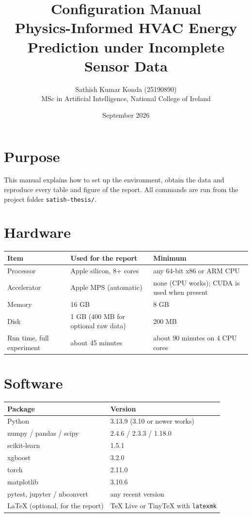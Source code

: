 \documentclass[11pt,a4paper]{article}
\title{Configuration Manual\\[4pt]\large Physics-Informed HVAC Energy Prediction under Incomplete Sensor Data}
\author{Sathish Kumar Konda (25190890)\\MSc in Artificial Intelligence, National College of Ireland}
\date{September 2026}
\begin{document}
\maketitle

\section{Purpose}
This manual explains how to set up the environment, obtain the data and reproduce every table and figure of the report. All commands are run from the project folder \nolinkurl{satish-thesis/}.

\section{Hardware}
\begin{table}[H]
\centering\small
\begin{tabular}{p{3.6cm}p{5.0cm}p{5.8cm}}
\toprule
Item & Used for the report & Minimum \\
\midrule
Processor & Apple silicon, 8+ cores & any 64-bit x86 or ARM CPU \\
Accelerator & Apple MPS (automatic) & none (CPU works); CUDA is used when present \\
Memory & 16 GB & 8 GB \\
Disk & 1 GB (400 MB for optional raw data) & 200 MB \\
Run time, full experiment & about 45 minutes & about 90 minutes on 4 CPU cores \\
\bottomrule
\end{tabular}
\end{table}

\section{Software}
\begin{table}[H]
\centering\small
\begin{tabular}{ll}
\toprule
Package & Version \\
\midrule
Python & 3.13.9 (3.10 or newer works) \\
numpy / pandas / scipy & 2.4.6 / 2.3.3 / 1.18.0 \\
scikit-learn & 1.5.1 \\
xgboost & 3.2.0 \\
torch & 2.11.0 \\
matplotlib & 3.10.6 \\
pytest, jupyter / nbconvert & any recent version \\
LaTeX (optional, for the report) & TeX Live or TinyTeX with \texttt{latexmk} \\
\bottomrule
\end{tabular}
\end{table}
\end{document}
